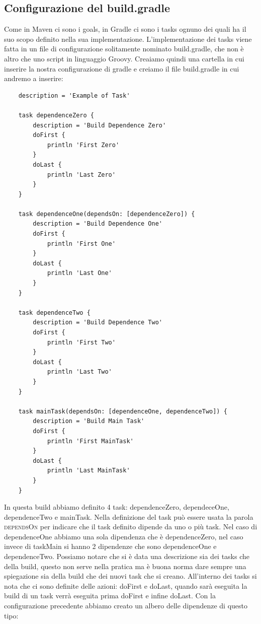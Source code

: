 \subsection{Configurazione del build.gradle}
\label{buildGradle}
Come in Maven ci sono i goals, in Gradle ci sono i tasks ognuno dei quali ha il suo scopo definito nella sua implementazione. L'implementazione dei tasks viene fatta in un file di configurazione solitamente nominato build.gradle, che non è altro che uno script in linguaggio Groovy. Creaiamo quindi una cartella in cui inserire la nostra configurazione di gradle e creiamo il file build.gradle in cui andremo a inserire:

\begin{verbatim}
    description = 'Example of Task'

    task dependenceZero {
        description = 'Build Dependence Zero'
        doFirst {
            println 'First Zero'
        }
        doLast {
            println 'Last Zero'
        }
    }

    task dependenceOne(dependsOn: [dependenceZero]) {
        description = 'Build Dependence One'
        doFirst {
            println 'First One'
        }
        doLast {
            println 'Last One'
        }
    }

    task dependenceTwo {
        description = 'Build Dependence Two'
        doFirst {
            println 'First Two'
        }
        doLast {
            println 'Last Two'
        }
    }

    task mainTask(dependsOn: [dependenceOne, dependenceTwo]) {
        description = 'Build Main Task'
        doFirst {
            println 'First MainTask'
        }
        doLast {
            println 'Last MainTask'
        }
    }
\end{verbatim}

In questa build abbiamo definito 4 task: dependenceZero, dependeceOne, dependenceTwo e mainTask. Nella definizione del task può essere usata la parola \textsc{dependsOn} per indicare che il task definito dipende da uno o più task. Nel caso di dependenceOne abbiamo una sola dipendenza che è dependenceZero, nel caso invece di taskMain si hanno 2 dipendenze che sono dependenceOne e dependenceTwo. Possiamo notare che si è data una descrizione sia dei tasks che della build, questo non serve nella pratica ma è buona norma dare sempre una spiegazione sia della build che dei nuovi task che si creano. All'interno dei tasks si nota che ci sono definite delle azioni: doFirst e doLast, quando sarà eseguita la build di un task verrà eseguita prima doFirst e infine doLast. Con la configurazione precedente abbiamo creato un albero delle dipendenze di questo tipo:

